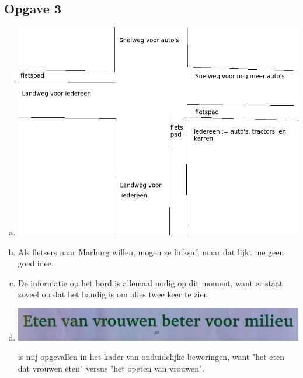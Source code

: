 \documentclass{article}
\begin{document}
\subsection*{Opgave 3}
\begin{enumerate}[a)]
 \item %
  \includegraphics[width=\textwidth]{verkeer.png}


 \item %
  Als fietsers naar Marburg willen, mogen ze linksaf, maar dat lijkt me geen goed idee.

 \item %
  De informatie op het bord is allemaal nodig op dit moment, want er staat zoveel op dat het handig is om alles twee keer te zien

 \item %
  \includegraphics[width=\textwidth]{eerstegoogleresultaatdatiedereeninlevert.jpg}
  
  is mij opgevallen in het kader van onduidelijke beweringen, want "het eten dat vrouwen eten" versus "het opeten van vrouwen".
\end{enumerate}
 
\end{document}
